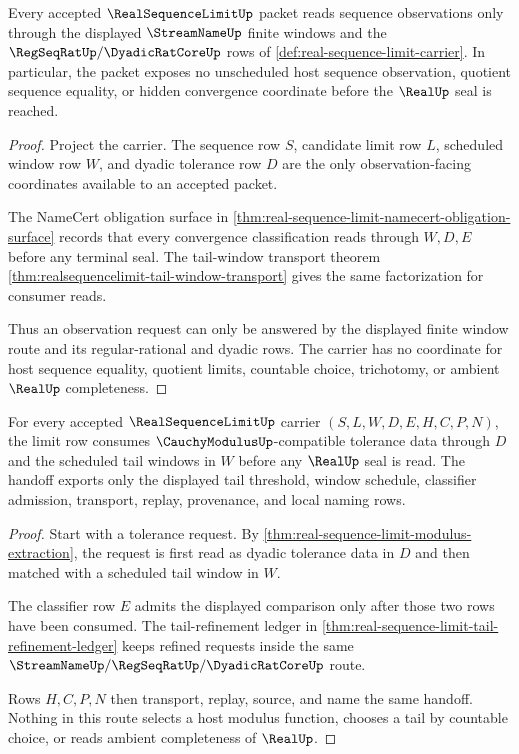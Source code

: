 \begin{theorem}\label{thm:real-sequence-limit-observation-window}
Every accepted $\RealSequenceLimitUp$ packet reads sequence observations only through the displayed $\StreamNameUp$ finite windows and the $\RegSeqRatUp/\DyadicRatCoreUp$ rows of \autoref{def:real-sequence-limit-carrier}. In particular, the packet exposes no unscheduled host sequence observation, quotient sequence equality, or hidden convergence coordinate before the $\RealUp$ seal is reached.
\end{theorem}
\begin{proof}
Project the carrier. The sequence row $S$, candidate limit row $L$, scheduled window row $W$, and dyadic tolerance row $D$ are the only observation-facing coordinates available to an accepted packet.

The NameCert obligation surface in \autoref{thm:real-sequence-limit-namecert-obligation-surface} records that every convergence classification reads through $W,D,E$ before any terminal seal. The tail-window transport theorem \autoref{thm:realsequencelimit-tail-window-transport} gives the same factorization for consumer reads.

Thus an observation request can only be answered by the displayed finite window route and its regular-rational and dyadic rows. The carrier has no coordinate for host sequence equality, quotient limits, countable choice, trichotomy, or ambient $\RealUp$ completeness.
\end{proof}

\begin{theorem}\label{thm:real-sequence-limit-cauchy-modulus-handoff}
For every accepted $\RealSequenceLimitUp$ carrier $(S,L,W,D,E,H,C,P,N)$, the limit row consumes $\CauchyModulusUp$-compatible tolerance data through $D$ and the scheduled tail windows in $W$ before any $\RealUp$ seal is read. The handoff exports only the displayed tail threshold, window schedule, classifier admission, transport, replay, provenance, and local naming rows.
\end{theorem}
\begin{proof}
Start with a tolerance request. By \autoref{thm:real-sequence-limit-modulus-extraction}, the request is first read as dyadic tolerance data in $D$ and then matched with a scheduled tail window in $W$.

The classifier row $E$ admits the displayed comparison only after those two rows have been consumed. The tail-refinement ledger in \autoref{thm:real-sequence-limit-tail-refinement-ledger} keeps refined requests inside the same $\StreamNameUp/\RegSeqRatUp/\DyadicRatCoreUp$ route.

Rows $H,C,P,N$ then transport, replay, source, and name the same handoff. Nothing in this route selects a host modulus function, chooses a tail by countable choice, or reads ambient completeness of $\RealUp$.
\end{proof}

